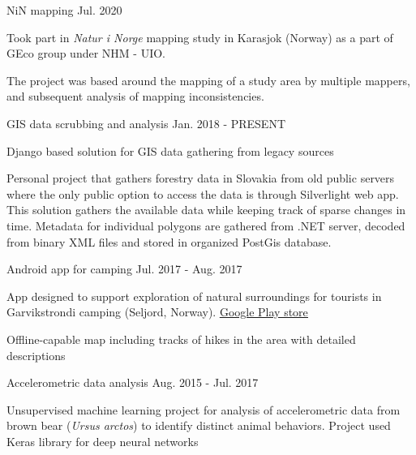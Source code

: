 
\begin{cventries}
  \cventry
    {} %
    {NiN mapping} %
    {} %
    {Jul. 2020} %
    {
      \begin{cvitems} %
        \item {Took part in \textit{Natur i Norge} mapping study in Karasjok (Norway) as a part of GEco group under NHM - UIO.}
		\item {The project was based around the mapping of a study area by multiple mappers, and subsequent analysis of mapping inconsistencies.}
      \end{cvitems}
    }

  \cventry
    {} %
    {GIS data scrubbing and analysis} %
    {} %
    {Jan. 2018 - PRESENT} %
    {
      \begin{cvitems} %
        \item {Django based solution for GIS data gathering from legacy sources}
		\item {Personal project that gathers forestry data in Slovakia from old public servers where the only public option to access the data is through \mbox{Silverlight} web app. This solution gathers the available data while keeping track of sparse changes in time. Metadata for individual polygons are gathered from .NET server, decoded from binary XML files and stored in organized \mbox{PostGis} database.}
      \end{cvitems}
    }

  \cventry
    {} %
    {Android app for camping} %
    {} %
    {Jul. 2017 - Aug. 2017} %
    {
      \begin{cvitems} %
      	\item {App designed to support exploration of natural surroundings for tourists in Garvikstrondi camping (Seljord, Norway). \underline{\href{https://play.google.com/store/apps/details?id=sk.malobysa.www.garvikstronditur&hl=en}{Google Play store}}}
      	\item {Offline-capable map including tracks of hikes in the area with detailed descriptions}
      \end{cvitems}
    }

  \cventry
    {} %
    {Accelerometric data analysis} %
    {} %
    {Aug. 2015 - Jul. 2017} %
    {
      \begin{cvitems} %
      	\item {Unsupervised machine learning project for analysis of accelerometric data from brown bear (\textit{Ursus arctos}) to identify distinct animal behaviors. Project used Keras library for deep neural networks}
      \end{cvitems}
    }
\end{cventries}
